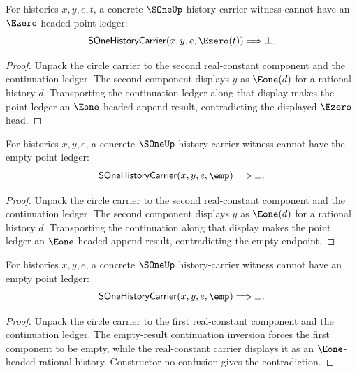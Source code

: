 \begin{theorem}
\label{thm:sone-history-carrier-point-e0-absurd}
For histories $x,y,e,t$, a concrete $\SOneUp$ history-carrier witness cannot
have an $\Ezero$-headed point ledger:
$$
\mathsf{SOneHistoryCarrier}(x,y,e,\Ezero(t))
\Longrightarrow
\bot.
$$
\end{theorem}
\begin{proof}
Unpack the circle carrier to the second real-constant component and the
continuation ledger. The second component displays $y$ as $\Eone(d)$ for a
rational history $d$. Transporting the continuation ledger along that display
makes the point ledger an $\Eone$-headed append result, contradicting the
displayed $\Ezero$ head.
\end{proof}

\begin{theorem}
\label{thm:sone-history-carrier-point-empty-absurd}
For histories $x,y,e$, a concrete $\SOneUp$ history-carrier witness cannot
have the empty point ledger:
$$
\mathsf{SOneHistoryCarrier}(x,y,e,\emp)
\Longrightarrow
\bot.
$$
\end{theorem}
\begin{proof}
Unpack the circle carrier to the second real-constant component and the
continuation ledger. The second component displays $y$ as $\Eone(d)$ for a
rational history $d$. Transporting the continuation along that display makes
the point ledger an $\Eone$-headed append result, contradicting the empty
endpoint.
\end{proof}

\begin{theorem}
\label{thm:sone-history-carrier-empty-point-absurd}
For histories $x,y,e$, a concrete $\SOneUp$ history-carrier witness cannot have
an empty point ledger:
$$
\mathsf{SOneHistoryCarrier}(x,y,e,\emp)
\Longrightarrow
\bot.
$$
\end{theorem}
\begin{proof}
Unpack the circle carrier to the first real-constant component and the
continuation ledger. The empty-result continuation inversion forces the first
component to be empty, while the real-constant carrier displays it as an
$\Eone$-headed rational history. Constructor no-confusion gives the
contradiction.
\end{proof}


